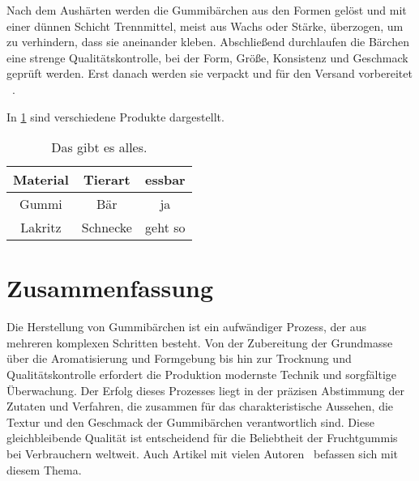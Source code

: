 \documentclass[ngerman]{seminarvorlage}
\begin{document}
Nach dem Aushärten werden die Gummibärchen aus den Formen gelöst und mit einer dünnen Schicht Trennmittel, meist aus Wachs oder Stärke, überzogen, um zu verhindern, dass sie aneinander kleben. Abschließend durchlaufen die Bärchen eine strenge Qualitätskontrolle, bei der Form, Größe, Konsistenz und Geschmack geprüft werden. Erst danach werden sie verpackt und für den Versand vorbereitet ~\cite{Black1988}.


In \cref{tttabelle} sind verschiedene Produkte dargestellt.


\begin{table}[htbp]
\begin{center}
\begin{tabular}{|c|c|c|}
\hline
Material & Tierart & essbar\\
\hline
Gummi & Bär & ja\\
Lakritz & Schnecke & geht so\\
\hline
\end{tabular}
\end{center}
\caption{Das gibt es alles.}
\label{tttabelle}
\end{table}

\section{Zusammenfassung}
Die Herstellung von Gummibärchen ist ein aufwändiger Prozess, der aus mehreren komplexen Schritten besteht. Von der Zubereitung der Grundmasse über die Aromatisierung und Formgebung bis hin zur Trocknung und Qualitätskontrolle erfordert die Produktion modernste Technik und sorgfältige Überwachung. Der Erfolg dieses Prozesses liegt in der präzisen Abstimmung der Zutaten und Verfahren, die zusammen für das charakteristische Aussehen, die Textur und den Geschmack der Gummibärchen verantwortlich sind. Diese gleichbleibende Qualität ist entscheidend für die Beliebtheit der Fruchtgummis bei Verbrauchern weltweit. Auch Artikel mit vielen Autoren~\cite{Black1988}
befassen sich mit diesem Thema.


%
%


\end{document}
